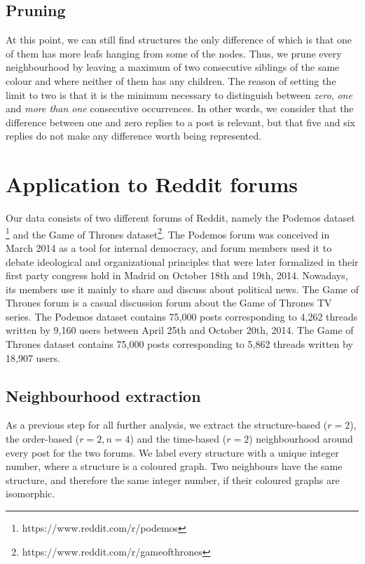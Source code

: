 \documentclass[conference]{IEEEtran}
\begin{document}
\subsection{Pruning}
At this point, we can still find structures the only difference of which is that one of them has more leafs hanging from some of the nodes. Thus, we prune every neighbourhood by leaving a maximum of two consecutive siblings of the same colour and where neither of them has any children. The reason of setting the limit to two is that it is the minimum necessary to distinguish between \textit{zero}, \textit{one} and \textit{more than one} consecutive occurrences. In other words, we consider that the difference between one and zero replies to a post is relevant, but that five and six replies do not make any difference worth being represented.    

\section{Application to Reddit forums}
Our data consists of two different forums of Reddit, namely the Podemos dataset \footnote{https://www.reddit.com/r/podemos} and the Game of Thrones dataset\footnote{https://www.reddit.com/r/gameofthrones}. The Podemos forum was conceived in March 2014 as a tool for internal democracy, and forum members used it to debate ideological and organizational principles that were later formalized in their first party congress hold in Madrid on October 18th and 19th, 2014. Nowadays, its members use it mainly to share and discuss about political news. The Game of Thrones forum is a casual discussion forum about the Game of Thrones TV series.
The Podemos dataset contains 75,000 posts corresponding to 4,262 threads written by 9,160 users between April 25th and October 20th, 2014. The Game of Thrones dataset contains 75,000 posts corresponding to 5,862 threads written by 18,907 users.

\subsection{Neighbourhood extraction}
As a previous step for all further analysis, we extract the structure-based ($r=2$), the order-based ($r=2, n=4$) and the time-based ($r=2$) neighbourhood around every post for the two forums. We label every structure with a unique integer number, where a structure is a coloured graph. Two neighbours have the same structure, and therefore the same integer number, if their coloured graphs are isomorphic.   
\end{document}

